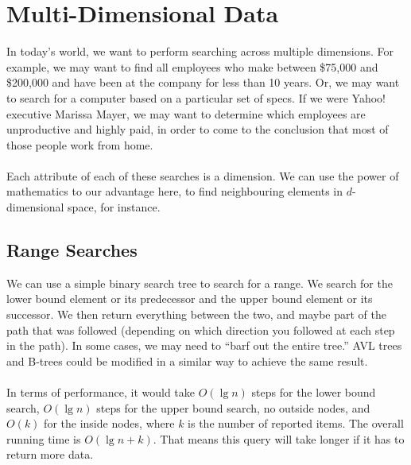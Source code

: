 \documentclass[]{article}
\theoremstyle{definition}
\begin{document}
	\section{Multi-Dimensional Data}
		In today's world, we want to perform searching across multiple dimensions. For example, we may want to find all employees who make between \$75,000 and \$200,000 and have been at the company for less than 10 years. Or, we may want to search for a computer based on a particular set of specs. If we were Yahoo! executive Marissa Mayer, we may want to determine which employees are unproductive and highly paid, in order to come to the conclusion that most of those people work from home.
		\\ \\
		Each attribute of each of these searches is a dimension. We can use the power of mathematics to our advantage here, to find neighbouring elements in $d$-dimensional space, for instance.
		
		\subsection{Range Searches}
			We can use a simple binary search tree to search for a range. We search for the lower bound element or its predecessor and the upper bound element or its successor. We then return everything between the two, and maybe part of the path that was followed (depending on which direction you followed at each step in the path). In some cases, we may need to ``barf out the entire tree.'' AVL trees and B-trees could be modified in a similar way to achieve the same result.
			\\ \\
			In terms of performance, it would take $O(\lg n)$ steps for the lower bound search, $O(\lg n)$ steps for the upper bound search, no outside nodes, and $O(k)$ for the inside nodes, where $k$ is the number of reported items. The overall running time is $O(\lg n + k)$. That means this query will take longer if it has to return more data.
\end{document}
